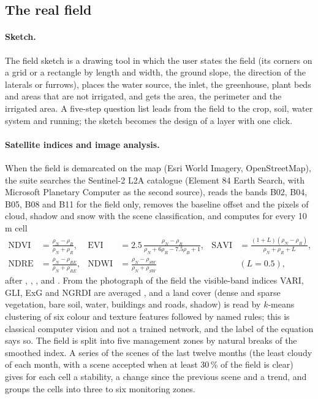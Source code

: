 \subsection{The real field}
\paragraph{Sketch.}
The field sketch is a drawing tool in which the user states the field (its corners on a grid or a rectangle by length and width, the ground slope, the direction of the laterals or furrows), places the water source, the inlet, the greenhouse, plant beds and areas that are not irrigated, and gets the area, the perimeter and the irrigated area. A five-step question list leads from the field to the crop, soil, water system and running; the sketch becomes the design of a layer with one click.

\paragraph{Satellite indices and image analysis.}
When the field is demarcated on the map (Esri World Imagery, OpenStreetMap), the suite searches the Sentinel-2 L2A catalogue (Element 84 Earth Search, with Microsoft Planetary Computer as the second source), reads the bands B02, B04, B05, B08 and B11 for the field only, removes the baseline offset and the pixels of cloud, shadow and snow with the scene classification, and computes for every 10\,m cell
\begin{equation}\label{eq:idx}
\begin{aligned}
\mathrm{NDVI}&=\frac{\rho_N-\rho_R}{\rho_N+\rho_R}, & \mathrm{EVI}&=2.5\,\frac{\rho_N-\rho_R}{\rho_N+6\rho_R-7.5\rho_B+1}, & \mathrm{SAVI}&=\frac{(1+L)(\rho_N-\rho_R)}{\rho_N+\rho_R+L},\\
\mathrm{NDRE}&=\frac{\rho_N-\rho_{RE}}{\rho_N+\rho_{RE}}, & \mathrm{NDWI}&=\frac{\rho_N-\rho_{SW}}{\rho_N+\rho_{SW}} & &(L=0.5),
\end{aligned}
\end{equation}
after \citet{Rouse1974}, \citet{Huete2002}, \citet{Huete1988}, \citet{Barnes2000} and \citet{Gao1996}. From the photograph of the field the visible-band indices VARI, GLI, ExG and NGRDI are averaged \citep{Gitelson2002,Woebbecke1995}, and a land cover (dense and sparse vegetation, bare soil, water, buildings and roads, shadow) is read by $k$-means clustering of six colour and texture features followed by named rules; this is classical computer vision and not a trained network, and the label of the equation says so. The field is split into five management zones by natural breaks of the smoothed index. A series of the scenes of the last twelve months (the least cloudy of each month, with a scene accepted when at least 30\,\% of the field is clear) gives for each cell a stability, a change since the previous scene and a trend, and groups the cells into three to six monitoring zones.


